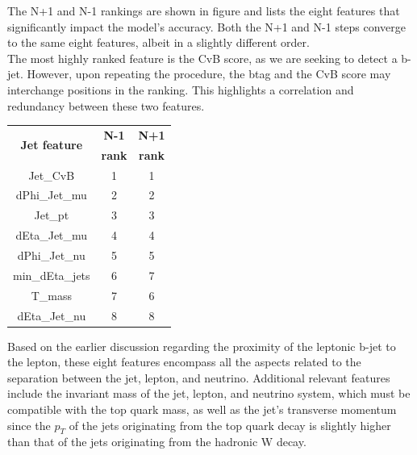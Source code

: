\begin{minipage}{\linewidth}
\begin{minipage}{0.5\linewidth}
    The N+1 and N-1 rankings are shown in figure  and  lists the eight features that significantly impact the model's accuracy. Both the N+1 and N-1 steps converge to the same eight features, albeit in a slightly different order.\\
    The most highly ranked feature is the CvB score, as we are seeking to detect a b-jet. However, upon repeating the procedure, the btag and the CvB score may interchange positions in the ranking. This highlights a correlation and redundancy between these two features.

\end{minipage}
\hfill
\begin{minipage}{0.45\linewidth}

        \centering
        \begin{tabular}{c|c|c}
        \toprule
        \multirow{2}{*}{\textbf{Jet feature}} & \textbf{N-1} & \textbf{N+1}\\
        & \textbf{rank} & \textbf{rank}\\
        \midrule
        Jet\_CvB & 1 & 1\\
        dPhi\_Jet\_mu & 2&2 \\
        Jet\_pt & 3& 3\\
        dEta\_Jet\_mu & 4& 4\\
        dPhi\_Jet\_nu & 5&5 \\
        min\_dEta\_jets & 6& 7\\
        T\_mass &7 & 6 \\
        dEta\_Jet\_nu & 8& 8\\
        \bottomrule
        \end{tabular}
        \label{tab:rank}
\end{minipage}
    
\end{minipage}
Based on the earlier discussion regarding the proximity of the leptonic b-jet to the lepton, these eight features encompass all the aspects related to the separation between the jet, lepton, and neutrino. Additional relevant features include the invariant mass of the jet, lepton, and neutrino system, which must be compatible with the top quark mass, as well as the jet's transverse momentum since the $p_T$ of the jets originating from the top quark decay is slightly higher than that of the jets originating from the hadronic W decay.


